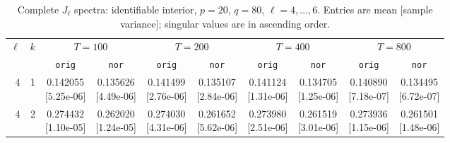 \documentclass[12pt,letterpaper]{article}
\def\spacingset#1{\renewcommand{\baselinestretch}{#1}\small\normalsize}
\theoremstyle{plain}
\theoremstyle{definition}
\begin{document}
\clearpage
\begin{table}[p]
\begingroup
\spacingset{1.0}
\small\centering
\caption{Complete $J_\ell$ spectra: identifiable interior, $p=20$, $q=80$, $\ell=4,\ldots,6$. Entries are mean [sample variance]; singular values are in ascending order.}
\label{s23:lambda:alltab:spectra:p20q80interior:4-6}
\footnotesize
\setlength{\tabcolsep}{2.2pt}
\renewcommand{\arraystretch}{1.03}
\begin{adjustbox}{max width=\linewidth}
\begin{tabular}{@{}rr*{8}{c}@{}}
\toprule
$\ell$ & $k$ & \multicolumn{2}{c}{$T=100$} & \multicolumn{2}{c}{$T=200$} & \multicolumn{2}{c}{$T=400$} & \multicolumn{2}{c}{$T=800$}\\
\cmidrule(lr){3-4}\cmidrule(lr){5-6}\cmidrule(lr){7-8}\cmidrule(lr){9-10}
 &  & \texttt{orig} & \texttt{nor} & \texttt{orig} & \texttt{nor} & \texttt{orig} & \texttt{nor} & \texttt{orig} & \texttt{nor}\\
\midrule
4 & 1 & \shortstack{0.142055\\[-1pt]{\scriptsize[5.25e-06]}} & \shortstack{0.135626\\[-1pt]{\scriptsize[4.49e-06]}} & \shortstack{0.141499\\[-1pt]{\scriptsize[2.76e-06]}} & \shortstack{0.135107\\[-1pt]{\scriptsize[2.84e-06]}} & \shortstack{0.141124\\[-1pt]{\scriptsize[1.31e-06]}} & \shortstack{0.134705\\[-1pt]{\scriptsize[1.25e-06]}} & \shortstack{0.140890\\[-1pt]{\scriptsize[7.18e-07]}} & \shortstack{0.134495\\[-1pt]{\scriptsize[6.72e-07]}}\\
4 & 2 & \shortstack{0.274432\\[-1pt]{\scriptsize[1.10e-05]}} & \shortstack{0.262020\\[-1pt]{\scriptsize[1.24e-05]}} & \shortstack{0.274030\\[-1pt]{\scriptsize[4.31e-06]}} & \shortstack{0.261652\\[-1pt]{\scriptsize[5.62e-06]}} & \shortstack{0.273980\\[-1pt]{\scriptsize[2.51e-06]}} & \shortstack{0.261519\\[-1pt]{\scriptsize[3.01e-06]}} & \shortstack{0.273936\\[-1pt]{\scriptsize[1.15e-06]}} & \shortstack{0.261501\\[-1pt]{\scriptsize[1.48e-06]}}\\

\end{tabular}
\end{adjustbox}
\end{table}
\end{document}
